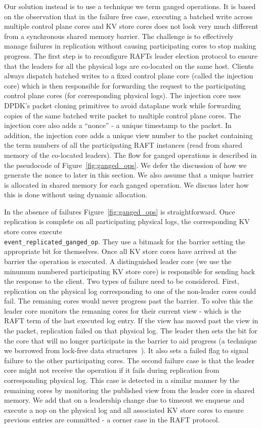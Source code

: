 \documentclass[10pt, preprint, nonatbib]{sigplanconf}
\begin{document}
Our solution instead is to use a technique we term ganged operations. It is
based on the observation that in the failure free case, executing a batched
write across multiple control plane cores and KV store cores does not look very
much different from a synchronous shared memory barrier. The challenge is to
effectively manage failures in replication without causing participating cores
to stop making progress. The first step is to reconfigure RAFTs leader election
protocol to ensure that the leaders for all the physical logs are co-located on
the same host. Clients always dispatch batched writes to a fixed control plane
core (called the injection core) which is then responsible for forwarding the
request to the participating control plane cores (for corresponding physical
logs). The injection core uses DPDK's packet cloning primitives to avoid
dataplane work while forwarding copies of the same batched write packet to
multiple control plane cores. The injection core also adds a ``nonce'' - a
unique timestamp to the packet. In addition, the injection core adds a unique
view number to the packet containing the term numbers of all the participating
RAFT instances (read from shared memory of the co-located leaders).  The flow
for ganged operations is described in the pseudocode of
Figure~\ref{fig:ganged_ops}. We defer the discussion of how we generate the
nonce to later in this section. We also assume that a unique barrier is
allocated in shared memory for each ganged operation. We discuss later how this
is done without using dynamic allocation.

In the absence of failures Figure~\ref{fig:ganged_ops} is straightforward. Once
replication is complete on all participating physical logs, the corresponding KV
store cores execute \\{\tt event\_replicated\_ganged\_op}. They use a bitmask
for the barrier setting the appropriate bit for themselves. Once all KV store
cores have arrived at the barrier the operation is executed. A distinguished
leader core (we use the minumum numbered participating KV store core) is
responsible for sending back the response to the client. Two types of failure
need to be considered. First, replication on the physical log corresponding to
one of the non-leader cores could fail. The remaning cores would never progress
past the barrier. To solve this the leader core monitors the remaning cores for
their current view - which is the RAFT term of the last executed log entry. If
the view has moved past the view in the packet, replication failed on that
physical log. The leader then sets the bit for the core that will no longer
participate in the barrier to aid progress (a technique we borrowed from
lock-free data structures~\cite{lock-free}). It also sets a failed flag to
signal failure to the other participating cores. The second failure case is that
the leader core might not receive the operation if it fails during replication
from corresponding physical log. This case is detected in a similar manner by
the remaining cores by monitoring the published view from the leader core in
shared memory. We add that on a leadership change due to timeout we enqueue and
execute a nop on the physical log and all associated KV store cores to ensure
previous entries are committed - a corner case in the RAFT protocol.
\end{document}
